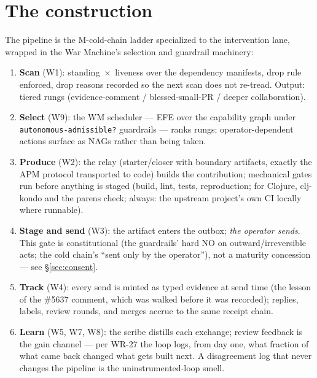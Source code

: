 \documentclass[11pt]{article}
\begin{document}
\section{The construction}

The pipeline is the M-cold-chain ladder specialized to the
intervention lane, wrapped in the War Machine's selection and
guardrail machinery:

\begin{enumerate}
\item \textbf{Scan} (W1): standing~$\times$~liveness over the
dependency manifests, drop rule enforced, drop reasons recorded so
the next scan does not re-tread. Output: tiered rungs
(evidence-comment / blessed-small-PR / deeper collaboration).
\item \textbf{Select} (W9): the WM scheduler --- EFE over the
capability graph under \texttt{autonomous-admissible?} guardrails ---
ranks rungs; operator-dependent actions surface as NAGs rather than
being taken.
\item \textbf{Produce} (W2): the relay (starter/closer with boundary
artifacts, exactly the APM protocol transported to code) builds the
contribution; mechanical gates run before anything is staged
(build, lint, tests, reproduction; for Clojure, clj-kondo and the
parens check; always: the upstream project's own CI locally where
runnable).
\item \textbf{Stage and send} (W3): the artifact enters the outbox;
\emph{the operator sends}. This gate is constitutional (the
guardrails' hard NO on outward/irreversible acts; the cold chain's
``sent only by the operator''), not a maturity concession --- see
\S\ref{sec:consent}.
\item \textbf{Track} (W4): every send is minted as typed evidence at
send time (the lesson of the \#5637 comment, which was walked before
it was recorded); replies, labels, review rounds, and merges accrue
to the same receipt chain.
\item \textbf{Learn} (W5, W7, W8): the scribe distills each exchange;
review feedback is the gain channel --- per WR-27 the loop logs, from
day one, what fraction of what came back changed what gets built
next. A disagreement log that never changes the pipeline is the
uninstrumented-loop smell.
\end{enumerate}
\end{document}
